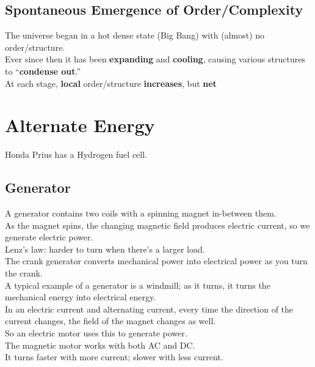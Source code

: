 \documentclass[12pt]{article}
\theoremstyle{definition}
\begin{document}
\subsection{Spontaneous Emergence of Order/Complexity}
The universe began in a hot dense state (Big Bang) with (almost) no order/structure. \\
Ever since then it has been \textbf{expanding} and \textbf{cooling}, causing various structures to ``\textbf{condense out}.'' \\

At each stage, \textbf{local} order/structure \textbf{increases}, but \textbf{net} \\

\newpage
\section{Alternate Energy}
Honda Prius has a Hydrogen fuel cell.
\subsection{Generator}
A generator contains two coils with a spinning magnet in-between them. \\
As the magnet spins, the changing magnetic field produces electric current, so we generate electric power. \\
Lenz's law: harder to turn when there's a larger load. \\

The crank generator converts mechanical power into electrical power as you turn the crank. \\

A typical example of a generator is a windmill;
as it turns, it turns the mechanical energy into electrical energy. \\

In an electric current and alternating current, every time the direction of the current changes, the field of the magnet changes as well. \\
So an electric motor uses this to generate power. \\

The magnetic motor works with both AC and DC. \\
It turns faster with more current;
slower with less current. \\
\end{document}
